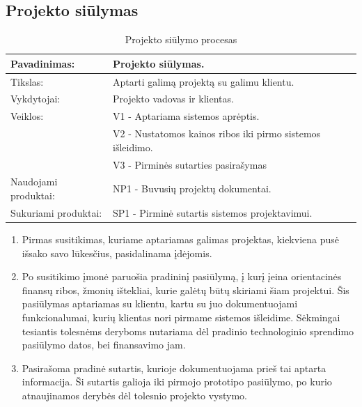 \documentclass{VUMIFPSkursinis}
\begin{document}
	\subsection{Projekto siūlymas}
	\begin{center}
		\begin{table}[ht]
			\caption{Projekto siūlymo procesas}
		\begin{tabular}{ | l | l | } 
		\hline
	Pavadinimas:         & Projekto siūlymas.                                      \\ \hline
	Tikslas: 	           & Aptarti galimą projektą su galimu klientu. 							\\ \hline
	Vykdytojai:          & Projekto vadovas ir klientas.                             \\ \hline
	Veiklos:             & V1 - Aptariama sistemos aprėptis. 													\\
											 & V2 - Nustatomos kainos ribos iki pirmo sistemos išleidimo.  \\
											 & V3 - Pirminės sutarties pasirašymas 													\\ \hline
	Naudojami produktai: & NP1 - Buvusių projektų dokumentai. 													 \\ \hline
	Sukuriami produktai: & SP1 - Pirminė sutartis sistemos projektavimui. 								\\ \hline
\end{tabular}
\end{table}
\end{center}
\begin{enumerate}
	\item Pirmas susitikimas, kuriame aptariamas galimas projektas, kiekviena pusė išsako savo lūkesčius, pasidalinama įdėjomis.
	\item Po susitikimo įmonė paruošia pradininį pasiūlymą, į kurį įeina orientacinės finansų ribos, žmonių ištekliai, kurie galėtų būtų skiriami šiam projektui. Šis pasiūlymas aptariamas su klientu, kartu su juo dokumentuojami funkcionalumai, kurių klientas nori pirmame sistemos išleidime. Sėkmingai tesiantis tolesnėms deryboms nutariama dėl pradinio technologinio sprendimo pasiūlymo datos, bei finansavimo jam.
	\item Pasirašoma pradinė sutartis, kurioje dokumentuojama prieš tai aptarta informacija. Ši sutartis galioja iki pirmojo prototipo pasiūlymo, po kurio atnaujinamos derybės dėl tolesnio projekto vystymo.
\end{enumerate}
\end{document}
